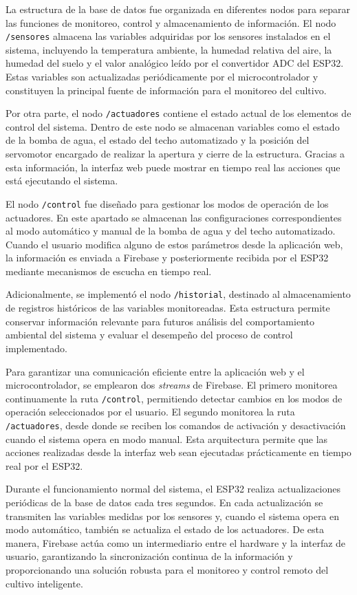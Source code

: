 \documentclass[conference]{IEEEtran}
\begin{document}
La estructura de la base de datos fue organizada en diferentes nodos para separar las funciones de monitoreo, control y almacenamiento de información. El nodo \texttt{/sensores} almacena las variables adquiridas por los sensores instalados en el sistema, incluyendo la temperatura ambiente, la humedad relativa del aire, la humedad del suelo y el valor analógico leído por el convertidor ADC del ESP32. Estas variables son actualizadas periódicamente por el microcontrolador y constituyen la principal fuente de información para el monitoreo del cultivo.

Por otra parte, el nodo \texttt{/actuadores} contiene el estado actual de los elementos de control del sistema. Dentro de este nodo se almacenan variables como el estado de la bomba de agua, el estado del techo automatizado y la posición del servomotor encargado de realizar la apertura y cierre de la estructura. Gracias a esta información, la interfaz web puede mostrar en tiempo real las acciones que está ejecutando el sistema.

El nodo \texttt{/control} fue diseñado para gestionar los modos de operación de los actuadores. En este apartado se almacenan las configuraciones correspondientes al modo automático y manual de la bomba de agua y del techo automatizado. Cuando el usuario modifica alguno de estos parámetros desde la aplicación web, la información es enviada a Firebase y posteriormente recibida por el ESP32 mediante mecanismos de escucha en tiempo real.

Adicionalmente, se implementó el nodo \texttt{/historial}, destinado al almacenamiento de registros históricos de las variables monitoreadas. Esta estructura permite conservar información relevante para futuros análisis del comportamiento ambiental del sistema y evaluar el desempeño del proceso de control implementado.

Para garantizar una comunicación eficiente entre la aplicación web y el microcontrolador, se emplearon dos \textit{streams} de Firebase. El primero monitorea continuamente la ruta \texttt{/control}, permitiendo detectar cambios en los modos de operación seleccionados por el usuario. El segundo monitorea la ruta \texttt{/actuadores}, desde donde se reciben los comandos de activación y desactivación cuando el sistema opera en modo manual. Esta arquitectura permite que las acciones realizadas desde la interfaz web sean ejecutadas prácticamente en tiempo real por el ESP32.

Durante el funcionamiento normal del sistema, el ESP32 realiza actualizaciones periódicas de la base de datos cada tres segundos. En cada actualización se transmiten las variables medidas por los sensores y, cuando el sistema opera en modo automático, también se actualiza el estado de los actuadores. De esta manera, Firebase actúa como un intermediario entre el hardware y la interfaz de usuario, garantizando la sincronización continua de la información y proporcionando una solución robusta para el monitoreo y control remoto del cultivo inteligente.
\end{document}
